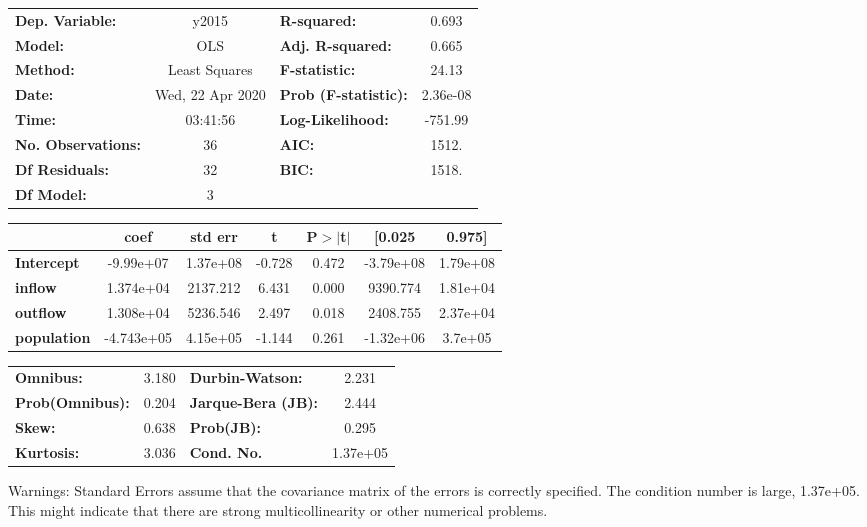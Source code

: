 \begin{center}
\begin{tabular}{lclc}
\toprule
\textbf{Dep. Variable:}    &      y2015       & \textbf{  R-squared:         } &     0.693   \\
\textbf{Model:}            &       OLS        & \textbf{  Adj. R-squared:    } &     0.665   \\
\textbf{Method:}           &  Least Squares   & \textbf{  F-statistic:       } &     24.13   \\
\textbf{Date:}             & Wed, 22 Apr 2020 & \textbf{  Prob (F-statistic):} &  2.36e-08   \\
\textbf{Time:}             &     03:41:56     & \textbf{  Log-Likelihood:    } &   -751.99   \\
\textbf{No. Observations:} &          36      & \textbf{  AIC:               } &     1512.   \\
\textbf{Df Residuals:}     &          32      & \textbf{  BIC:               } &     1518.   \\
\textbf{Df Model:}         &           3      & \textbf{                     } &             \\
\bottomrule
\end{tabular}
\begin{tabular}{lcccccc}
                    & \textbf{coef} & \textbf{std err} & \textbf{t} & \textbf{P$> |$t$|$} & \textbf{[0.025} & \textbf{0.975]}  \\
\midrule
\textbf{Intercept}  &    -9.99e+07  &     1.37e+08     &    -0.728  &         0.472        &    -3.79e+08    &     1.79e+08     \\
\textbf{inflow}     &    1.374e+04  &     2137.212     &     6.431  &         0.000        &     9390.774    &     1.81e+04     \\
\textbf{outflow}    &    1.308e+04  &     5236.546     &     2.497  &         0.018        &     2408.755    &     2.37e+04     \\
\textbf{population} &   -4.743e+05  &     4.15e+05     &    -1.144  &         0.261        &    -1.32e+06    &      3.7e+05     \\
\bottomrule
\end{tabular}
\begin{tabular}{lclc}
\textbf{Omnibus:}       &  3.180 & \textbf{  Durbin-Watson:     } &    2.231  \\
\textbf{Prob(Omnibus):} &  0.204 & \textbf{  Jarque-Bera (JB):  } &    2.444  \\
\textbf{Skew:}          &  0.638 & \textbf{  Prob(JB):          } &    0.295  \\
\textbf{Kurtosis:}      &  3.036 & \textbf{  Cond. No.          } & 1.37e+05  \\
\bottomrule
\end{tabular}
\end{center}

Warnings: \newline
 [1] Standard Errors assume that the covariance matrix of the errors is correctly specified. \newline
 [2] The condition number is large, 1.37e+05. This might indicate that there are \newline
 strong multicollinearity or other numerical problems.
